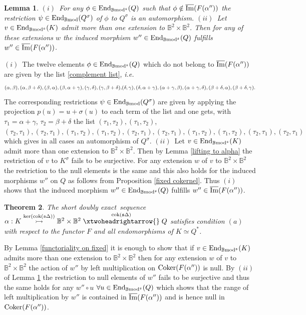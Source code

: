 \documentclass[12pt]{article}
\newtheorem{thm}{Theorem}[section]
\newtheorem{lem}[thm]{Lemma}
\def\End{{\rm End}}
\def\sker{{\rm ker}}
\def\coker{{\rm Coker}}
\def\scoker{{\rm cok}}
\def\B{{\mathbb B}}
\def\imm{\overline{\rm Im}}
\def\exxx{{doubly exact}~}
\newcommand{\ie}{{\it i.e.\/}\ }
\def\End{{\mbox{End}}}
\def\yb{\mathfrak{s}}
\def\bmod{{\rm \B mod}}
\def\b2{{\rm \B mod^{\mathfrak s}}}
\begin{document}
 \begin{lem}\label{property of complement}
$(i)$~For any $\phi\in \End_\b2(Q)$ such that $\phi\notin \imm(F(\alpha''))$ the restriction $\psi\in \End_\bmod(Q^\sigma)$ of $\phi$ to $Q^\sigma$ is an automorphism.\newline
 $(ii)$~Let $v\in\End_\b2(K)$  admit more than one extension to $\B^2\times \B^2$. Then for any of these extensions $w$ the induced morphism $w''\in \End_\b2(Q)$ fulfills $w''\in \imm(F(\alpha''))$.
 \end{lem}
\proof $(i)$~The twelve elements $\phi\in \End_\b2(Q)$ which do not belong to $\imm(F(\alpha''))$ are given by the list \eqref{complement list}, \ie
\begin{equation}\label{complement list1}
 (\alpha ,\beta ),(\alpha ,\beta +\delta ),(\beta ,\alpha ),(\beta ,\alpha +\gamma ),(\gamma ,\delta ),(\gamma ,\beta +\delta ),$$ $$(\delta ,\gamma ),(\delta ,\alpha +\gamma ),(\alpha +\gamma ,\beta ),(\alpha +\gamma ,\delta ),(\beta +\delta ,\alpha ),(\beta +\delta ,\gamma ).	
 \end{equation}
 The corresponding restrictions $\psi\in \End_\bmod(Q^\sigma)$ are given by applying the projection $p(u)=u+\sigma(u)$ to each term of the list and one gets, with $\tau_1=\alpha+\gamma$, $\tau_2=\beta+\delta$ the list
 $ (\tau_1 ,\tau_2 ),(\tau_1 ,\tau_2 )$, $(\tau_2 ,\tau_1 ),(\tau_2 ,\tau_1 ),(\tau_1 ,\tau_2 ),(\tau_1 ,\tau_2 ),(\tau_2 ,\tau_1 ),(\tau_2 ,\tau_1 ),(\tau_1 ,\tau_2 ),(\tau_1 ,\tau_2 ),(\tau_2 ,\tau_1 ),(\tau_2 ,\tau_1 )
 $ which gives in all cases an automorphism of $Q^\sigma$.\newline
 $(ii)$~Let $v\in\End_\b2(K)$  admit more than one extension to $\B^2\times \B^2$. Then by Lemma \ref{lifting to alpha} the restriction of $v$ to $K^\sigma$ fails to be surjective. For any extension $w$ of $v$ to $\B^2\times \B^2$ the restriction to the null elements is the same and this also holds for the induced morphisms $w''$ on $Q$ as follows from Proposition \ref{fixed cokernel}. Thus $(i)$ shows that the induced morphism $w''\in \End_\b2(Q)$ fulfills $w''\in \imm(F(\alpha''))$.\endproof 
 
 \begin{thm}\label{sequence alpha} The short \exxx sequence $\alpha:K\stackrel{\sker(\scoker(\yb\Delta))}{\rightarrowtail} \B^2\times \B^2\stackrel{\scoker(\yb\Delta)}{\xtwoheadrightarrow{}}Q$ satisfies condition $(a)$  with respect to the functor $F$ and all endomorphisms of $K\simeq Q^*$.  	
 \end{thm}
\proof By Lemma \ref{functoriality on fixed} it is enough to show that if $v\in\End_\b2(K)$  admits more than one extension to $\B^2\times \B^2$ then for any extension $w$ of $v$ to $\B^2\times \B^2$ the action of $w''$ by left multiplication on $\coker(F(\alpha''))$ is null. By $(ii)$ of Lemma \ref{property of complement} the restriction to null elements of $w''$ fails to be surjective and thus the same holds for any $w''\circ u$ $\forall u\in \End_\b2(Q)$ which shows that the range of left multiplication by $w''$ is contained in $\imm(F(\alpha''))$ and is hence null in  $\coker(F(\alpha''))$. \endproof
\end{document}
